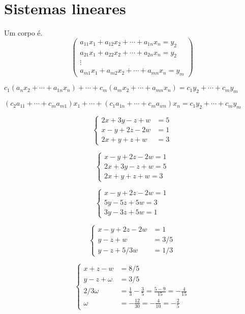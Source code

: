 \chapter{Sistemas lineares}

\begin{definition}
  Um corpo é.
  \[
    \begin{pmatrix}
      a_{11} x_{1}+a_{12} x_{2}+\cdots+a_{1n} x_{n}=y_{2} \\
      a_{21} x_{1}+a_{22} x_{2}+\cdots+a_{2n} x_{n}=y_{2} \\
      \vdots                                              \\
      a_{m1} x_{1}+a_{m2} x_{2}+\cdots+a_{mn} x_{n}=y_{m}
    \end{pmatrix}
  \]
\end{definition}


$c_{1}\left(a_{n}x_{2}+\cdots+a_{1n}x_{n}\right)+
  \cdots+
  c_{m}\left(a_{m}x_{2}+\cdots+a_{mn}x_{n}\right)=
  c_{1}y_{2}+\cdots+c_{m}y_{m}$

$\left(c_{2}a_{11}+\cdots+c_{m}a_{m1}\right)
  x_{1}+\cdots+\left(c_{1}a_{1n}+\cdots+c_{m}a_{w n}\right)
  x_{n}=
  c_{1}y_{2}+\cdots+c_{m}y_{m}$

\[
  \left\{\begin{aligned}
    2 x+3 y-z+w & =5 \\
    x-y+2 z-2 w & =1 \\
    2 x+y+z+w   & =3
  \end{aligned}\right.
\]

\[  \left\{\begin{array}{l}
    x-y+2 z-2 w=1 \\
    2 x+3 y-z+w=5 \\
    2 x+y+z+w=3
  \end{array}\right.
\]

\[
  \left\{\begin{array}{l}
    x-y+2 z-2 w=1 \\
    5 y-5 z+5 w=3 \\
    3 y-3 z+5 w=1
  \end{array}\right.
\]

\[
  \left\{\begin{aligned}
    x-y+2 z-2 w & =1     \\
    y-z+w       & =3 / 5 \\
    y-z+5 / 3 w & =1 / 3
  \end{aligned}\right.
\]

\[
  \left\{\begin{aligned}
    x+z-w        & =8 / 5                                                \\
    y-z+\omega   & =3 / 5                                                \\
    2 / 3 \omega & =\frac{1}{3}-\frac{3}{5}=\frac{5-9}{15}=-\frac{4}{15} \\
    \omega       & =-\frac{12}{30}=-\frac{4}{10}=-\frac{2}{5}
  \end{aligned}\right.
\]

